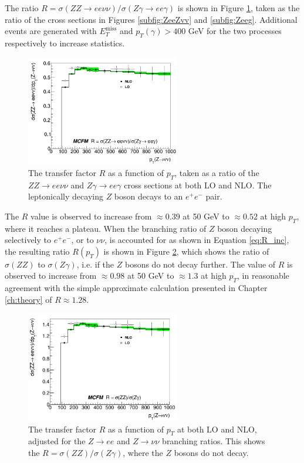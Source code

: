 \documentclass[11pt,a4paper,openright,twoside]{report}
\newcommand{\met}{$E_T^{\mathrm{miss}}$ }
\begin{document}
The ratio $R = \sigma(ZZ\rightarrow ee\nu\nu)/\sigma(Z\gamma\rightarrow ee\gamma)$ is shown in Figure \ref{fig:Rcurve}, taken as the ratio of the cross sections in Figures \ref{subfig:ZeeZvv} and \ref{subfig:Zeeg}. Additional events are generated with \met and $p_T(\gamma) > 400$ GeV for the two processes respectively to increase statistics. 
\begin{figure}[H]
	\centering
	\includegraphics[width= 0.6\textwidth]{R.png}
	\caption{The transfer factor $R$ as a function of $p_T$, taken as a ratio of  the $ZZ\to ee\nu\nu$ and $Z\gamma\to ee\gamma$ cross sections at both LO and NLO. The leptonically decaying $Z$ boson decays to an $e^+e^-$ pair.}
	\label{fig:Rcurve}
\end{figure}
The $R$ value is observed to increase from $\approx 0.39$ at 50 GeV to $\approx 0.52$ at high $p_T$, where it reaches a plateau. When the branching ratio of $Z$ boson decaying selectively to $e^+e^-$, or to $\nu\nu$, is accounted for as shown in Equation \ref{eq:R_inc}, the resulting ratio $R(p_T)$ is shown in Figure \ref{fig:RcurveBR}, which shows the ratio of $\sigma(ZZ)$ to $\sigma(Z\gamma)$, i.e. if the $Z$ bosons do not decay further. The value of $R$ is observed to increase from $\approx 0.98$ at 50 GeV to $\approx 1.3$ at high $p_T$, in reasonable agreement with the simple approximate calculation presented in Chapter \ref{ch:theory} of $R \approx 1.28$.
\begin{figure}[H]
	\centering
	\includegraphics[width = 0.6\textwidth]{R_BR.png}
	\caption{The transfer factor $R$ as a function of $p_T$ at both LO and NLO, adjusted for the $Z\rightarrow ee$ and $Z\rightarrow \nu\nu$ branching ratios. This shows the $R=\sigma(ZZ)/\sigma(Z\gamma)$, where the $Z$ bosons do not decay.}
	\label{fig:RcurveBR}
\end{figure}
\end{document}
